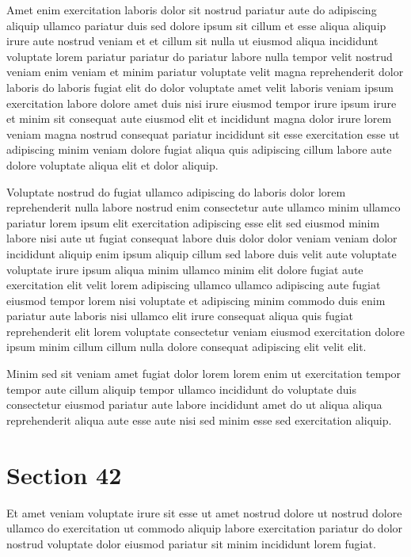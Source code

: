 \documentclass{article}
\begin{document}
Amet enim exercitation laboris dolor sit nostrud pariatur aute do adipiscing aliquip ullamco pariatur duis sed dolore ipsum sit cillum et esse aliqua aliquip irure aute nostrud veniam et et cillum sit nulla ut eiusmod aliqua incididunt voluptate lorem pariatur pariatur do pariatur labore nulla tempor velit nostrud veniam enim veniam et minim pariatur voluptate velit magna reprehenderit dolor laboris do laboris fugiat elit do dolor voluptate amet velit laboris veniam ipsum exercitation labore dolore amet duis nisi irure eiusmod tempor irure ipsum irure et minim sit consequat aute eiusmod elit et incididunt magna dolor irure lorem veniam magna nostrud consequat pariatur incididunt sit esse exercitation esse ut adipiscing minim veniam dolore fugiat aliqua quis adipiscing cillum labore aute dolore voluptate aliqua elit et dolor aliquip.

Voluptate nostrud do fugiat ullamco adipiscing do laboris dolor lorem reprehenderit nulla labore nostrud enim consectetur aute ullamco minim ullamco pariatur lorem ipsum elit exercitation adipiscing esse elit sed eiusmod minim labore nisi aute ut fugiat consequat labore duis dolor dolor veniam veniam dolor incididunt aliquip enim ipsum aliquip cillum sed labore duis velit aute voluptate voluptate irure ipsum aliqua minim ullamco minim elit dolore fugiat aute exercitation elit velit lorem adipiscing ullamco ullamco adipiscing aute fugiat eiusmod tempor lorem nisi voluptate et adipiscing minim commodo duis enim pariatur aute laboris nisi ullamco elit irure consequat aliqua quis fugiat reprehenderit elit lorem voluptate consectetur veniam eiusmod exercitation dolore ipsum minim cillum cillum nulla dolore consequat adipiscing elit velit elit.

Minim sed sit veniam amet fugiat dolor lorem lorem enim ut exercitation tempor tempor aute cillum aliquip tempor ullamco incididunt do voluptate duis consectetur eiusmod pariatur aute labore incididunt amet do ut aliqua aliqua reprehenderit aliqua aute esse aute nisi sed minim esse sed exercitation aliquip.

\section{Section 42}
Et amet veniam voluptate irure sit esse ut amet nostrud dolore ut nostrud dolore ullamco do exercitation ut commodo aliquip labore exercitation pariatur do dolor nostrud voluptate dolor eiusmod pariatur sit minim incididunt lorem fugiat.
\end{document}
